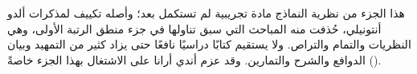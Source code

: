 \documentclass[../../include/open-logic-part]{subfiles}
\begin{document}

\begin{editorial}
  هذا الجزء من نظرية النماذج مادة تجريبية لم تستكمل بعد؛ وأصله
  تكييف لمذكرات ألدو أنتونيلي، حُذفت منه المباحث التي سبق تناولها
  في جزء منطق الرتبة الأولى، وهي النظريات والتمام والتراص. ولا
  يستقيم كتابًا دراسيًا نافعًا حتى يزاد كثير من التمهيد وبيان
  الدوافع والشرح والتمارين. وقد عزم أندي أرانا على الاشتغال بهذا
  الجزء خاصةً ().
\end{editorial}





\OLEndPartHook
\end{document}

